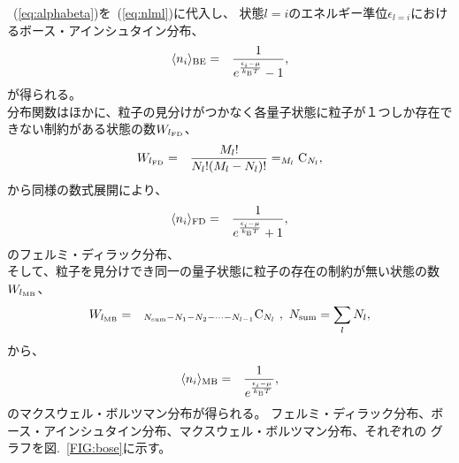 \documentclass[12pt,a4paper]{jbook}
\newcommand{\kb} {k_{\rm B}}				%
\begin{document}
        ~(\ref{eq:alphabeta})を~(\ref{eq:nlml})に代入し、
        状態$l=i$のエネルギー準位$\epsilon_{l=i}$におけるボース・アインシュタイン分布、
		\begin{eqnarray}
            \label{eq:becdist}
			\langle n_i \rangle_{\rm BE}
			& = &
			\frac{1}{e^{\frac{\epsilon_i - \mu}{{\kb} T}} - 1},
		\end{eqnarray}
        が得られる。
        \\
        分布関数はほかに、粒子の見分けがつかなく各量子状態に粒子が１つしか存在できない制約がある状態の数$W_{l_{\rm FD}}$、
        \begin{eqnarray}
            W_{l_{\rm FD}} & = & \frac{M_l !}{N_l ! (M_l - N_l)!} =  _{M_l}{\rm C}_{N_l},
        \end{eqnarray}
        から同様の数式展開により、
        \begin{eqnarray}
            \langle n_i \rangle_{\rm FD}
            & = & 
			\frac{1}{e^{\frac{\epsilon_i - \mu}{{\kb} T}} + 1},
        \end{eqnarray}
        のフェルミ・ディラック分布、
        \\
        そして、粒子を見分けでき同一の量子状態に粒子の存在の制約が無い状態の数$W_{l_{\rm MB}}$、
        \begin{eqnarray}
            W_{l_{\rm MB}} & = & _{N_{\rm sum} - N_1 - N_2 - \cdots - N_{l-1}}{\rm C}_{N_l} \ , \ N_{\rm sum} = \sum_l N_l,
        \end{eqnarray}
        から、
        \begin{eqnarray}
            \langle n_i \rangle_{\rm MB}
            & = & 
			\frac{1}{e^{\frac{\epsilon_i - \mu}{{\kb} T}} },
        \end{eqnarray}
        のマクスウェル・ボルツマン分布が得られる。
		フェルミ・ディラック分布、ボース・アインシュタイン分布、マクスウェル・ボルツマン分布、それぞれの
        グラフを図.~\ref{FIG:bose}に示す。
\end{document}
